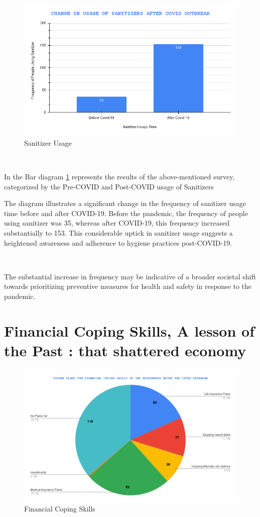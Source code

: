 \begin{figure}[h!]
	\centering
	\includegraphics[width=0.9\linewidth]{IMAGES/Image 36.png}
	\caption{Sanitizer Usage}
	\label{G36}
\end{figure}

\ 

In the Bar diagram \ref{G36} represents the results of the above-mentioned survey, categorized by the Pre-COVID and Post-COVID usage of Sanitizers  

The diagram illustrates a significant change in the frequency of sanitizer usage time before and after COVID-19. Before the pandemic, the frequency of people using sanitizer was 35, whereas after COVID-19, this frequency increased substantially to 153. This considerable uptick in sanitizer usage suggests a heightened awareness and adherence to hygiene practices post-COVID-19. 

\

The substantial increase in frequency may be indicative of a broader societal shift towards prioritizing preventive measures for health and safety in response to the pandemic.

\section{Financial Coping Skills, A lesson of the Past : that shattered economy}

\begin{figure}[h!]
	\centering
	\includegraphics[width=0.9\linewidth]{IMAGES/Image 37.png}
	\caption{Financial Coping Skills}
	\label{G37}
\end{figure}

